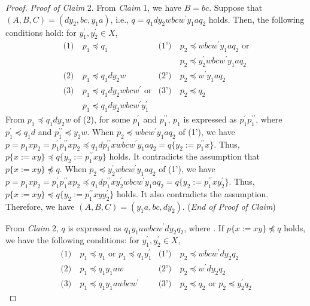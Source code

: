 \begin{proof}
  \smallskip
  \noindent
  \textit{Proof of Claim} 2.
  From \textit{Claim} 1, we have $B=bc$. Suppose that $(A, B, C) = (dy_{2}, bc, y_{1}a)$, i.e., $q = q_{1}dy_{2}wbcw^{\prime}y_{1}aq_{2} $ holds. Then, the following conditions hold: for $y_{1}^{\prime},y_{2}^{\prime}\in X$,
  \begin{align*}
  \textrm{(1)}~& p_{1} \preceq q_{1} & \textrm{(1')}~& p_{2} \preceq wbcw^{\prime}y_{1}aq_{2}\mbox{ or}\\
  & & & p_{2} \preceq y_{2}^{\prime}wbcw^{\prime}y_{1}aq_{2}\\
  \textrm{(2)}~& p_{1} \preceq q_{1}dy_{2}w & \textrm{(2')}~& p_{2} \preceq w^{\prime}y_{1}aq_{2} \\
  \textrm{(3)}~& p_{1} \preceq q_{1}dy_{2}wbcw^{\prime}\mbox{ or} & \textrm{(3')}~& p_{2} \preceq q_{2}\\
  & p_{1} \preceq q_{1}dy_{2}wbcw^{\prime}y_{1}^{\prime}& &
  \end{align*}
  From $p_{1} \preceq q_{1}dy_{2}w$ of (2), for some $p^{\prime}_{1}$ and $p^{\prime\prime}_{1}$, $p_{1}$ is expressed as $p^{\prime}_{1}p^{\prime\prime}_{1}$, where $p^{\prime}_{1} \preceq q_{1}d$ and $p^{\prime\prime}_{1} \preceq y_{2}w$. 
  When $p_{2} \preceq wbcw^{\prime}y_{1}aq_{2}$ of (1'), we have $p=p_{1}xp_{2}=p^{\prime}_{1}p^{\prime\prime}_{1}xp_{2} \preceq q_{1}dp^{\prime\prime}_{1}xwbcw^{\prime}y_{1}aq_{2}=q \{ y_{2}:=p^{\prime\prime}_{1}x \}$. Thus, $p \{ x := xy \} \preceq q \{ y_{2}:=p^{\prime\prime}_{1}xy \}$ holds. It contradicts the assumption that $p \{ x := xy \} \not \preceq q$.
  When $p_{2} \preceq y_{2}^{\prime}wbcw^{\prime}y_{1}aq_{2}$ of (1'), we have $p=p_{1}xp_{2}=p^{\prime}_{1}p^{\prime\prime}_{1}xp_{2} \preceq q_{1}dp^{\prime\prime}_{1}xy_{2}^{\prime}wbcw^{\prime}y_{1}aq_{2}=q \{ y_{2}:=p^{\prime\prime}_{1}xy_{2}^{\prime} \}$.
  Thus, $p \{ x := xy \} \preceq q \{ y_{2}:=p^{\prime\prime}_{1}xyy_{2}^{\prime} \}$ holds. It also contradicts the assumption.
  Therefore, we have $(A, B, C) = (y_{1}a, bc, dy_{2})$.
  (\textit{End of Proof of Claim})

  \smallskip

  From \textit{Claim} 2, $q$ is expressed as $q_{1}y_{1}awbcw^{\prime}dy_{2}q_{2}$, where \TheConditionA.
  If $p \{ x := xy \} \not \preceq q$ holds, we have the following conditions:
  for $y_{1}^{\prime},y_{2}^{\prime}\in X$,
  \begin{align*}
    \textrm{(1)}~& p_{1} \preceq q_{1} \mbox{ or } p_{1} \preceq q_{1}y_{1}^{\prime} & \textrm{(1')}~& p_{2} \preceq wbcw^{\prime}dy_{2}q_{2} \\
    \textrm{(2)}~& p_{1} \preceq q_{1}y_{1}aw & \textrm{(2')}~& p_{2} \preceq w^{\prime}dy_{2}q_{2} \\
    \textrm{(3)}~& p_{1} \preceq q_{1}y_{1}awbcw^{\prime} & \textrm{(3')}~& p_{2} \preceq q_{2} \mbox{ or } p_{2} \preceq y_{2}^{\prime}q_{2}
  \end{align*}


\end{proof}
